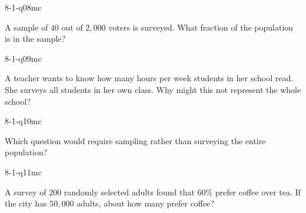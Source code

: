 \begin{practiceQuestion}{8-1-q08}{mc}
\begin{questionText}
A sample of $40$ out of $2{,}000$ voters is surveyed. What fraction of the population is in the sample?
\end{questionText}
\end{practiceQuestion}

\begin{practiceQuestion}{8-1-q09}{mc}
\begin{questionText}
A teacher wants to know how many hours per week students in her school read. She surveys all students in her own class. Why might this not represent the whole school?
\end{questionText}
\end{practiceQuestion}

\begin{practiceQuestion}{8-1-q10}{mc}
\begin{questionText}
Which question would require sampling rather than surveying the entire population?
\end{questionText}
\end{practiceQuestion}

\begin{practiceQuestion}{8-1-q11}{mc}
\begin{questionText}
A survey of $200$ randomly selected adults found that $60\%$ prefer coffee over tea. If the city has $50{,}000$ adults, about how many prefer coffee?
\end{questionText}
\end{practiceQuestion}

